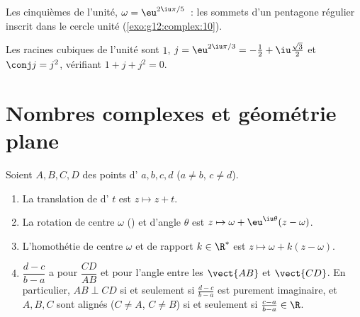 \begin{omfigure}

{\small Les  cinquièmes de l'unité, $\omega = \eu^{2\iu\pi/5}$~: les
sommets d'un pentagone régulier inscrit dans le cercle unité
(\cref{exo:g12:complex:10}).}
\end{omfigure}

\begin{example}
Les racines cubiques de l'unité sont $1$, $j = \eu^{2\iu\pi/3} =
-\frac12 + \iu\frac{\sqrt3}{2}$ et $\conj j = j^2$, vérifiant
$1 + j + j^2 = 0$.
\end{example}

\section{Nombres complexes et géométrie plane}

\begin{proposition}\label{prop:g12:complex:geometry}
Soient $A, B, C, D$ des points d' $a, b, c, d$ ($a \neq b$,
$c \neq d$).
\begin{enumerate}
  \item La translation de  d' $t$ est $z \mapsto z + t$.
  \item La rotation de centre $\omega$ () et d'angle $\theta$ est
        $z \mapsto \omega + \eu^{\iu\theta}(z - \omega)$.
  \item L'homothétie de centre $\omega$ et de rapport
        $k \in \R^*$ est $z \mapsto \omega + k(z - \omega)$.
  \item $\dfrac{d - c}{b - a}$ a pour  $\dfrac{CD}{AB}$ et pour
         l'angle entre les  $\vect{AB}$ et $\vect{CD}$. En
        particulier, $AB \perp CD$ si et seulement si $\frac{d-c}{b-a}$ est
        purement imaginaire, et $A, B, C$ sont alignés ($C \ne A$, $C\ne B$)
        si et seulement si $\frac{c-a}{b-a} \in \R$.
\end{enumerate}
\end{proposition}

